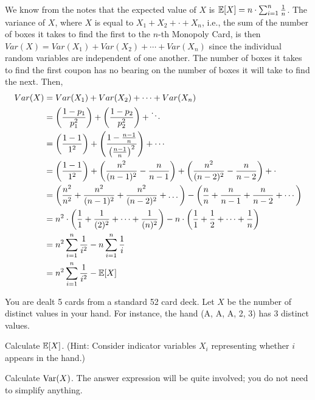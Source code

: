 \documentclass[11pt]{article}
\begin{document}
\begin{solution}

We know from the notes that the expected value of $X$ is $\operatorname{\mathbb{E}}[X] = n \cdot 
\sum_{i=1}^{n} \frac{1}{n}$. The variance of $X$, where $X$ is equal to $X_1 + 
X_2 + \cdot + X_n$, i.e., the sum of the number of boxes it takes to find the
first to the $n$-th Monopoly Card, is then $Var(X) = Var(X_1) + Var(X_2) + \cdots 
+ Var(X_n)$ since the individual random variables are independent of one another.
The number of boxes it takes to find the first coupon has no bearing on the 
number of boxes it will take to find the next. Then, 
\[
	\begin{split}
		Var(X) &= Var(X_1) + Var(X_2) + \dots + Var(X_n) \\
		&= \left( \frac{1-p_1}{p_1^2} \right) + \left( \frac{1-p_2}{p_2^2} \right) + \ddots \\
		&= \left( \frac{1-1}{1^2} \right) + \left( \frac{1-\frac{n-1}{n}}{\left( \frac{n-1}{n} \right)^2} \right) + \cdots \\
		&= \left( \frac{1-1}{1^2} \right) + \left( \frac{n^2}{(n-1)^2} - \frac{n}{n-1} \right) + \left( \frac{n^2}{(n-2)^2} - \frac{n}{n-2} \right) + \cdot \\
		&= \left( \frac{n^2}{n^2} + \frac{n^2}{(n-1)^2}  + \frac{n^2}{(n-2)^2} + \dots \right) 
		- \left( \frac{n}{n} + \frac{n}{n-1} + \frac{n}{n-2} + \cdots \right) \\
		&= n^2 \cdot \left( \frac{1}{1} + \frac{1}{(2)^2}  + \dots + \frac{1}{(n)^2} \right) 
		- n \cdot \left( \frac{1}{1} + \frac{1}{2} + \dots + \frac{1}{n}  \right) \\
		&= n^2 \sum_{i=1}^{n} \frac{1}{i^2} - n \sum_{i=1}^{n} \frac{1}{i} \\
		&= n^2 \sum_{i=1}^{n} \frac{1}{i^2} - \operatorname{\mathbb{E}}[X]
	\end{split}
\]

\end{solution}


You are dealt 5 cards from a standard 52 card deck. Let $X$ be the number of distinct values in your hand. For instance, the hand (A, A, A, 2, 3) has 3 distinct values.

\begin{Parts}

\Part Calculate $\operatorname{\mathbb{E}}[X]$. (Hint: Consider indicator variables $X_i$ representing whether $i$ appears in the hand.)

\Part Calculate $\operatorname{Var}(X)$. The answer expression will be quite involved; you do not need to simplify anything.

\end{Parts}
\end{document}
